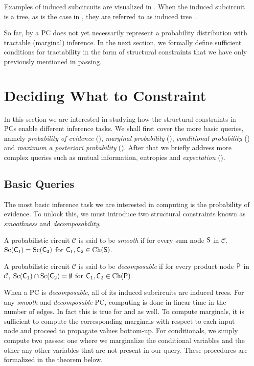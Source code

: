 Examples of induced subcircuits are visualized in . When the induced subcircuit
is a tree, as is the case in , they are referred to as induced tree
\citep{zhao15,zhao16b}.

So far, by  a PC does not yet necessarily represent a probability distribution with
tractable (marginal) inference. In the next section, we formally define sufficient conditions for
tractability in the form of structural constraints that we have only previously mentioned in
passing.

\section{Deciding What to Constraint}
\label{sec:const}

In this section we are interested in studying how the structural constraints in PCs enable
different inference tasks. We shall first cover the more basic queries, namely \emph{probability of
evidence} (\evi), \emph{marginal probability} (\mar), \emph{conditional probability} (\con) and
\emph{maximum a posteriori probability} (\map). After that we briefly address more complex queries
such as mutual information, entropies and \emph{expectation} (\expc).

\subsection{Basic Queries}

The most basic inference task we are interested in computing is the probability of evidence. To
unlock this, we must introduce two structural constraints known as \emph{smoothness} and
\emph{decomposability}.

\begin{definition}[Smoothness]
  A probabilistic circuit $\mathcal{C}$ is said to be \emph{smooth} if for every sum node $\operatorname{\textsf{S}}$ in
  $\mathcal{C}$, $\operatorname*{\normalfont{Sc}}(\operatorname{\textsf{C}}_1)=\operatorname*{\normalfont{Sc}}(\operatorname{\textsf{C}}_2)$ for $\operatorname{\textsf{C}}_1,\operatorname{\textsf{C}}_2\in\operatorname*{\normalfont{Ch}}(\operatorname{\textsf{S}})$.
\end{definition}

\begin{definition}[Decomposability]
  A probabilistic circuit $\mathcal{C}$ is said to be \emph{decomposable} if for every product node
  $\operatorname{\textsf{P}}$ in $\mathcal{C}$, $\operatorname*{\normalfont{Sc}}(\operatorname{\textsf{C}}_1)\cap\operatorname*{\normalfont{Sc}}(\operatorname{\textsf{C}}_2)=\emptyset$ for $\operatorname{\textsf{C}}_1,\operatorname{\textsf{C}}_2\in
  \operatorname*{\normalfont{Ch}}(\operatorname{\textsf{P}})$.
\end{definition}

When a PC is \emph{decomposable}, all of its induced subcircuits are induced trees. For any
\emph{smooth} and \emph{decomposable} PC, computing \evi{} is done in linear time in the number of
edges. In fact this is true for \mar{} and \con{} as well. To compute marginals, it is sufficient
to compute the corresponding marginals with respect to each input node and proceed to propagate
values bottom-up. For conditionals, we simply compute two passes: one where we marginalize the
conditional variables and the other any other variables that are not present in our query. These
procedures are formalized in the theorem below.

